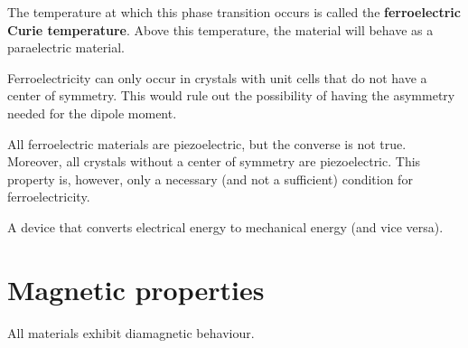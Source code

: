     The temperature at which this phase transition occurs is called the \textbf{ferroelectric Curie temperature}. Above this temperature, the material will behave as a paraelectric material.

   \begin{remark}
       Ferroelectricity can only occur in crystals with unit cells that do not have a center of symmetry. This would rule out the possibility of having the asymmetry needed for the dipole moment.
   \end{remark}


    \begin{remark}
        All ferroelectric materials are piezoelectric, but the converse is not true. Moreover, all crystals without a center of symmetry are piezoelectric. This property is, however, only a necessary (and not a sufficient) condition for ferroelectricity.
    \end{remark}

    \begin{example}[Transducer]
        A device that converts electrical energy to mechanical energy (and vice versa).
    \end{example}

\section{Magnetic properties}

    \begin{remark}
        All materials exhibit diamagnetic behaviour.
    \end{remark}

